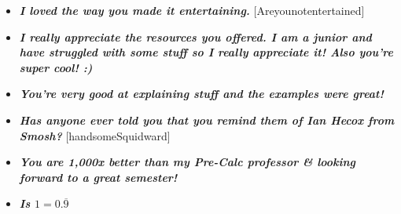 \documentclass[11pt,letterpaper]{article}
\begin{document}
\begin{itemize}
\item {\bfseries\itshape I loved the way you made it entertaining.} [Areyounotentertained]
\item {\bfseries\itshape I really appreciate the resources you offered. I am a junior and have struggled with some stuff so I really appreciate it! Also you're super cool! :) }
\item {\bfseries\itshape You're very good at explaining stuff and the examples were great!}
\item {\bfseries\itshape Has anyone ever told you that you remind them of Ian Hecox from Smosh?} [handsomeSquidward]
\item {\bfseries\itshape You are 1,000x better than my Pre-Calc professor \& looking forward to a great semester!}
\item {\bfseries\itshape Is $1= 0.\overline{9}$}
\end{itemize}
\end{document}
